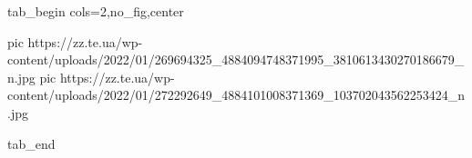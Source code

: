  
 
 
 
 


\ifcmt
  tab_begin cols=2,no_fig,center

     pic https://zz.te.ua/wp-content/uploads/2022/01/269694325_4884094748371995_3810613430270186679_n.jpg
		 pic https://zz.te.ua/wp-content/uploads/2022/01/272292649_4884101008371369_103702043562253424_n.jpg

  tab_end
\fi
